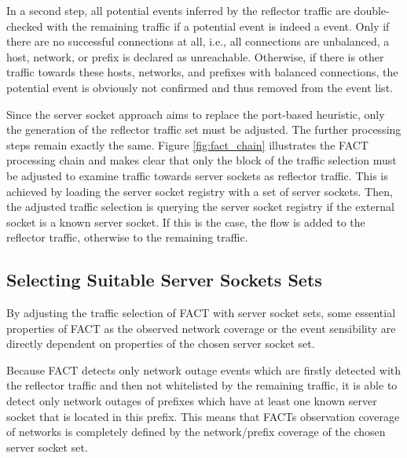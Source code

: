 In a second step, all potential events inferred by the reflector traffic are  double-checked with the remaining traffic if a potential event is indeed a  event. 
Only if there are no successful connections at all, i.e., all connections  are unbalanced, a host, network, or prefix is declared as unreachable. 
Otherwise, if there is other traffic towards these hosts, networks, and prefixes with balanced connections, the potential event is obviously not confirmed and thus removed from the event list. 

Since the \gls{server socket} approach aims to replace the port-based heuristic,  only the generation of the reflector traffic set must be adjusted. 
The further processing steps remain exactly the same. 
Figure \ref{fig:fact_chain} illustrates the \gls{FACT} processing chain and makes clear that only the block of the traffic selection must be adjusted to examine traffic towards \glspl{server socket} as reflector traffic. 
This is achieved by loading the \gls{server socket} registry with a set of \glspl{server socket}. 
Then, the adjusted traffic selection is querying the server socket registry if the external socket is a known \gls{server socket}. 
If this is the case, the flow is added to the reflector traffic, otherwise to the remaining traffic. 

\subsection{Selecting Suitable Server Sockets Sets\label{section:ses_selection}}
By adjusting the traffic selection of \gls{FACT} with \gls{server socket} sets,  some essential properties of \gls{FACT} as the observed network coverage or the event sensibility are directly dependent on properties of the chosen \gls{server socket} set. 

Because \gls{FACT} detects only network outage events which are firstly detected  with the reflector traffic and then not whitelisted by the remaining traffic, it  is able to detect only network outages of prefixes which have at least one known  server socket that is located in this prefix. This means that FACTs observation  coverage of networks is completely defined by the network/prefix coverage of the  chosen \gls{server socket} set. 

